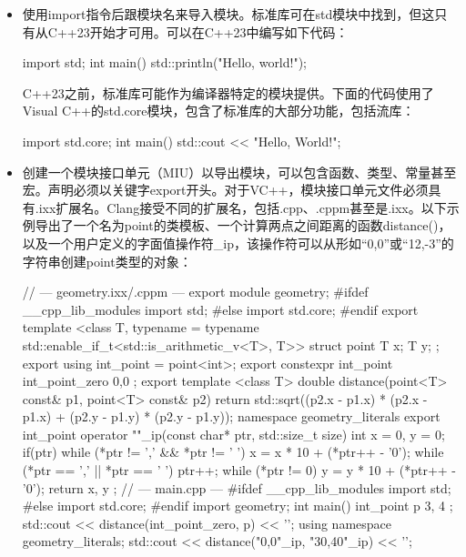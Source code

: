 \begin{itemize}
\item
使用import指令后跟模块名来导入模块。标准库可在std模块中找到，但这只有从C++23开始才可用。可以在C++23中编写如下代码：

\begin{cpp}
import std;
int main()
{
    std::println("Hello, world!");
}
\end{cpp}

C++23之前，标准库可能作为编译器特定的模块提供。下面的代码使用了Visual C++的std.core模块，包含了标准库的大部分功能，包括流库：

\begin{cpp}
import std.core;
int main()
{
    std::cout << "Hello, World!\n";
}
\end{cpp}

\item
创建一个模块接口单元（MIU）以导出模块，可以包含函数、类型、常量甚至宏。声明必须以关键字export开头。对于VC++，模块接口单元文件必须具有.ixx扩展名。Clang接受不同的扩展名，包括.cpp、.cppm甚至是.ixx。以下示例导出了一个名为point的类模板、一个计算两点之间距离的函数distance()，以及一个用户定义的字面值操作符\_ip，该操作符可以从形如“0,0”或“12,-3”的字符串创建point类型的对象：

\begin{cpp}
// --- geometry.ixx/.cppm ---
export module geometry;
#ifdef __cpp_lib_modules
import std;
#else
import std.core;
#endif
export template <class T,
    typename = typename std::enable_if_t<std::is_arithmetic_v<T>, T>>
struct point
{
    T x;
    T y;
};
export using int_point = point<int>;
export constexpr int_point int_point_zero{ 0,0 };
export template <class T>
double distance(point<T> const& p1, point<T> const& p2)
{
    return std::sqrt((p2.x - p1.x) * (p2.x - p1.x) +
                     (p2.y - p1.y) * (p2.y - p1.y));
}
namespace geometry_literals
{
    export int_point operator ""_ip(const char* ptr, std::size_t size)
    {
        int x = 0, y = 0;
        if(ptr)
        {
            while (*ptr != ',' && *ptr != ' ')
                x = x * 10 + (*ptr++ - '0');
            while (*ptr == ',' || *ptr == ' ') ptr++;
            while (*ptr != 0)
                y = y * 10 + (*ptr++ - '0');
        }
        return { x, y };
    }
}
// --- main.cpp ---
#ifdef __cpp_lib_modules
import std;
#else
import std.core;
#endif
import geometry;
int main()
{
    int_point p{ 3, 4 };
    std::cout << distance(int_point_zero, p) << '\n';
    {
        using namespace geometry_literals;
        std::cout << distance("0,0"_ip, "30,40"_ip) << '\n';
    }
}
\end{cpp}


\end{itemize}
